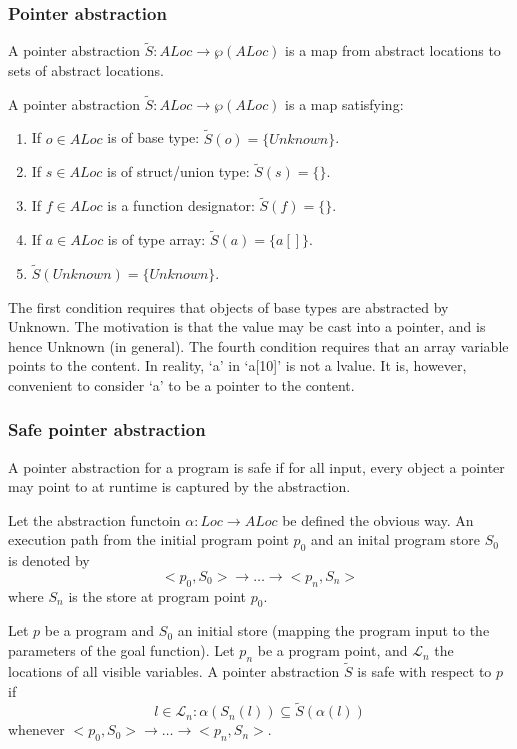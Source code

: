 \subsubsection{Pointer abstraction}

A pointer abstraction $\tilde{S} : ALoc \rightarrow \wp(ALoc)$ is a map from
abstract locations to sets of abstract locations.

\begin{Definition}
\label{def:pt-abs}
  A pointer abstraction $\tilde{S} : ALoc \rightarrow \wp(ALoc)$ is a map
  satisfying:
  \begin{enumerate}
  \item If $o \in ALoc$ is of base type: $\tilde{S}(o) = \{Unknown\}$.
  \item If $s \in ALoc$ is of struct/union type: $\tilde{S}(s) = \{\}$.
  \item If $f \in ALoc$ is a function designator: $\tilde{S}(f) = \{\}$.
  \item If $a \in ALoc$ is of type array: $\tilde{S}(a) = \{a[]\}$.
  \item $\tilde{S}(Unknown) = \{Unknown\}$.
  \end{enumerate}
\end{Definition}

The first condition requires that objects of base types are abstracted by
Unknown. The motivation is that the value may be cast into a pointer, and is
hence Unknown (in general). The fourth condition requires that an array
variable points to the content. In reality, `a' in `a[10]' is not a lvalue. It
is, however, convenient to consider `a' to be a pointer to the content.

\subsubsection{Safe pointer abstraction}

A pointer abstraction for a program is safe if for all input, every object a
pointer may point to at runtime is captured by the abstraction.

Let the abstraction functoin $\alpha : Loc \rightarrow ALoc$ be defined the
obvious way. An execution path from the initial program point $p_0$ and an
inital program store $S_0$ is denoted by
$$<p_0,S_0> \rightarrow \dots \rightarrow <p_n,S_n>$$
where $S_n$ is the store at program point $p_0$.

Let $p$ be a program and $S_0$ an initial store (mapping the program input to
the parameters of the goal function). Let $p_n$ be a program point, and
$\mathcal{L}_n$ the locations of all visible variables. A pointer abstraction
$\tilde{S}$ is safe with respect to $p$ if
$$l \in \mathcal{L}_n : \alpha(S_n(l)) \subseteq \tilde{S}(\alpha(l))$$
whenever $<p_0,S_0> \rightarrow \dots \rightarrow <p_n,S_n>$.

